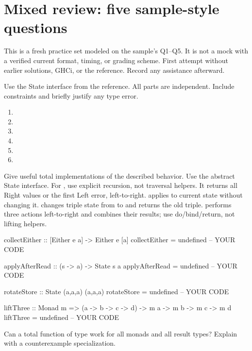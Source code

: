 \chapter{Mixed review: five sample-style questions}
This is a fresh practice set modeled on the sample's Q1--Q5. It is not a mock
with a verified current format, timing, or grading scheme. First attempt without
earlier solutions, GHCi, or the reference. Record any assistance afterward.

Use the State interface from the reference. All parts are independent. Include
constraints and briefly justify any type error.
\begin{enumerate}[label=(\alph*)]
\item {}
\answer{[Answer.]}
\item {}
\answer{[Answer.]}
\item {}
\answer{[Answer.]}
\item {}
\answer{[Answer.]}
\item {}
\answer{[Answer.]}
\item {}
\answer{[Answer.]}
\end{enumerate}

\clearpage
{}
Give useful total implementations of the described behavior. Use the abstract
State interface. For , use explicit recursion, not traversal
helpers. It returns all Right values or the first Left error, left-to-right.
 applies  to current state without changing it.
 changes triple state from  to 
and returns the old triple.  performs three actions left-to-right
and combines their results; use do/bind/return, not lifting helpers.
\par\noindent\begin{minipage}{\linewidth}
\begin{codeanswer}
collectEither :: [Either e a] -> Either e [a]
collectEither = undefined  -- YOUR CODE

applyAfterRead :: (s -> a) -> State s a
applyAfterRead = undefined  -- YOUR CODE

rotateStore :: State (a,a,a) (a,a,a)
rotateStore = undefined  -- YOUR CODE

liftThree :: Monad m => (a -> b -> c -> d) -> m a -> m b -> m c -> m d
liftThree = undefined  -- YOUR CODE
\end{codeanswer}
\end{minipage}\par
Can a total function of type  work for all monads
and all result types? Explain with a counterexample specialization.

